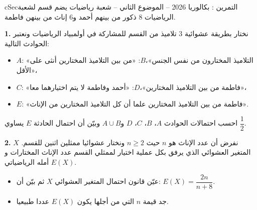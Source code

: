 \documentclass[12pt,a4paper]{article}
\newenvironment{BOX}[2]{\begin{otherlanguage}{english}\begin{arbox}{#1}{#2}}{\end{arbox}\end{otherlanguage}}
\newcounter{exo}
\newenvironment{tamrin}[1]{\stepcounter{exo}\begin{BOX}{cSec}{التمرين \theexo: #1}}{\end{BOX}}
\newenvironment{sq}{\begin{itemize}[leftmargin=2.4em,itemsep=3pt]}{\end{itemize}}
\newcommand{\qa}{\item[(أ)]}\newcommand{\qb}{\item[(ب)]}\newcommand{\qc}{\item[(جـ)]}\newcommand{\qd}{\item[(د)]}\newcommand{\qe}{\item[(هـ)]}
\newcommand{\QQ}[1]{\par\smallskip\textbf{#1.} }
\begin{document}
\begin{tamrin}{بكالوريا 2026 -- الموضوع الثاني -- شعبة رياضيات}
يضم قسم لشعبة الرياضيات $8$ ذكور من بينهم أحمد و$6$ إناث من بينهن فاطمة.

\QQ{1} نختار بطريقة عشوائية $3$ تلاميذ من القسم للمشاركة في أولمبياد الرياضيات ونعتبر الحوادث التالية:
\begin{itemize}
\item $A$: «التلاميذ المختارون من نفس الجنس»،\quad $B$: «من بين التلاميذ المختارين أنثى على الأقل»،
\item $C$: «فاطمة من بين التلاميذ المختارين»،\quad $D$: «أحمد وفاطمة لا يتم اختيارهما معا»،
\item $E$: «فاطمة من بين التلاميذ المختارين علما أن كل التلاميذ المختارين من الإناث».
\end{itemize}
احسب احتمالات الحوادث $A$، $B$، $C$، $D$ و$A\cup B$ وبيّن أن احتمال الحادثة $E$ يساوي $\dfrac12$.

\QQ{2} نفرض أن عدد الإناث هو $n$ حيث $n\geqslant 2$ ونختار عشوائيا ممثلين اثنين للقسم.
$X$ المتغير العشوائي الذي يرفق بكل عملية اختيار لممثلي القسم عدد الإناث المختارات و$E(X)$ أمله الرياضياتي.
\begin{sq}
\qa عيّن قانون احتمال المتغير العشوائي $X$ ثم بيّن أن: $E(X)=\dfrac{2n}{n+8}$.
\qb جد قيمة $n$ التي من أجلها يكون $E(X)$ عددا طبيعيا.
\end{sq}
\end{tamrin}
\end{document}
